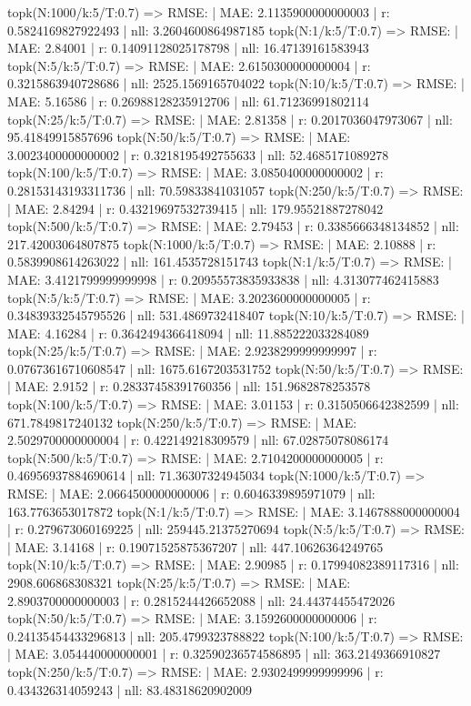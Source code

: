 topk(N:1000/k:5/T:0.7) => RMSE: | MAE: 2.1135900000000003 | r: 0.5824169827922493 | nll: 3.2604600864987185
topk(N:1/k:5/T:0.7) => RMSE: | MAE: 2.84001 | r: 0.14091128025178798 | nll: 16.47139161583943
topk(N:5/k:5/T:0.7) => RMSE: | MAE: 2.6150300000000004 | r: 0.3215863940728686 | nll: 2525.1569165704022
topk(N:10/k:5/T:0.7) => RMSE: | MAE: 5.16586 | r: 0.26988128235912706 | nll: 61.71236991802114
topk(N:25/k:5/T:0.7) => RMSE: | MAE: 2.81358 | r: 0.2017036047973067 | nll: 95.41849915857696
topk(N:50/k:5/T:0.7) => RMSE: | MAE: 3.0023400000000002 | r: 0.3218195492755633 | nll: 52.4685171089278
topk(N:100/k:5/T:0.7) => RMSE: | MAE: 3.0850400000000002 | r: 0.28153143193311736 | nll: 70.59833841031057
topk(N:250/k:5/T:0.7) => RMSE: | MAE: 2.84294 | r: 0.43219697532739415 | nll: 179.95521887278042
topk(N:500/k:5/T:0.7) => RMSE: | MAE: 2.79453 | r: 0.3385666348134852 | nll: 217.42003064807875
topk(N:1000/k:5/T:0.7) => RMSE: | MAE: 2.10888 | r: 0.5839908614263022 | nll: 161.4535728151743
topk(N:1/k:5/T:0.7) => RMSE: | MAE: 3.4121799999999998 | r: 0.20955573835933838 | nll: 4.313077462415883
topk(N:5/k:5/T:0.7) => RMSE: | MAE: 3.2023600000000005 | r: 0.34839332545795526 | nll: 531.4869732418407
topk(N:10/k:5/T:0.7) => RMSE: | MAE: 4.16284 | r: 0.3642494366418094 | nll: 11.885222033284089
topk(N:25/k:5/T:0.7) => RMSE: | MAE: 2.9238299999999997 | r: 0.07673616710608547 | nll: 1675.6167203531752
topk(N:50/k:5/T:0.7) => RMSE: | MAE: 2.9152 | r: 0.28337458391760356 | nll: 151.9682878253578
topk(N:100/k:5/T:0.7) => RMSE: | MAE: 3.01153 | r: 0.3150506642382599 | nll: 671.7849817240132
topk(N:250/k:5/T:0.7) => RMSE: | MAE: 2.5029700000000004 | r: 0.422149218309579 | nll: 67.02875078086174
topk(N:500/k:5/T:0.7) => RMSE: | MAE: 2.7104200000000005 | r: 0.46956937884690614 | nll: 71.36307324945034
topk(N:1000/k:5/T:0.7) => RMSE: | MAE: 2.0664500000000006 | r: 0.6046339895971079 | nll: 163.7763653017872
topk(N:1/k:5/T:0.7) => RMSE: | MAE: 3.1467888000000004 | r: 0.279673060169225 | nll: 259445.21375270694
topk(N:5/k:5/T:0.7) => RMSE: | MAE: 3.14168 | r: 0.19071525875367207 | nll: 447.10626364249765
topk(N:10/k:5/T:0.7) => RMSE: | MAE: 2.90985 | r: 0.17994082389117316 | nll: 2908.606868308321
topk(N:25/k:5/T:0.7) => RMSE: | MAE: 2.8903700000000003 | r: 0.2815244426652088 | nll: 24.44374455472026
topk(N:50/k:5/T:0.7) => RMSE: | MAE: 3.1592600000000006 | r: 0.24135454433296813 | nll: 205.4799323788822
topk(N:100/k:5/T:0.7) => RMSE: | MAE: 3.054440000000001 | r: 0.32590236574586895 | nll: 363.2149366910827
topk(N:250/k:5/T:0.7) => RMSE: | MAE: 2.9302499999999996 | r: 0.434326314059243 | nll: 83.48318620902009
